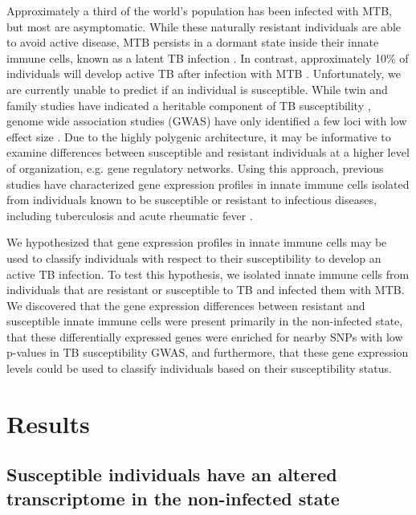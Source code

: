 Approximately a third of the world's population has been infected with
MTB, but most are asymptomatic. While these naturally resistant
individuals are able to avoid active disease, MTB persists in a
dormant state inside their innate immune cells, known as a latent TB
infection \citep{Munoz2015}. In contrast, approximately 10\% of
individuals will develop active TB after infection with MTB
\citep{North2004, OGarra2013}. Unfortunately, we are currently unable
to predict if an individual is susceptible. While twin and family
studies have indicated a heritable component of TB susceptibility
\citep{Kallmann1943, Comstock1978, Cobat2010, Moller2010}, genome wide
association studies (GWAS) have only identified a few loci with low
effect size \citep{Thye2010, Mahasirimongkol2012, Thye2012, Png2012,
  Chimusa2014, Curtis2015, Sobota2016}. Due to the highly polygenic
architecture, it may be informative to examine differences between
susceptible and resistant individuals at a higher level of
organization, e.g. gene regulatory networks. Using this approach,
previous studies have characterized gene expression profiles in innate
immune cells isolated from individuals known to be susceptible or
resistant to infectious diseases, including tuberculosis
\citep{Thuong2008} and acute rheumatic fever \citep{Bryant2014}.

We hypothesized that gene expression profiles in innate immune cells
may be used to classify individuals with respect to their
susceptibility to develop an active TB infection. To test this
hypothesis, we isolated innate immune cells from individuals that are
resistant or susceptible to TB and infected them with MTB. We
discovered that the gene expression differences between resistant and
susceptible innate immune cells were present primarily in the
non-infected state, that these differentially expressed genes were
enriched for nearby SNPs with low p-values in TB susceptibility GWAS,
and furthermore, that these gene expression levels could be used to
classify individuals based on their susceptibility status.

\section{Results}

\subsection{Susceptible individuals have an altered transcriptome in the non-infected state}

